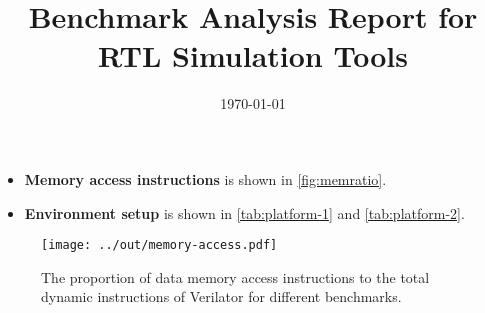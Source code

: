 \documentclass{article}
\title{Benchmark Analysis Report for RTL Simulation Tools}
\date{\today}
\author{}
\begin{document}
\maketitle

\begin{itemize}[noitemsep,topsep=0pt]
    \item {\bf Memory access instructions } is shown in \autoref{fig:memratio}.
    \item {\bf Environment setup} is shown in \autoref{tab:platform-1} and \autoref{tab:platform-2}.
  \end{itemize}




\centering


\begin{figure}[h!]
  \centering
  \texttt{[image: ../out/memory-access.pdf]}
  \vspace*{-4mm}
  \caption{The proportion of data memory access instructions to the total dynamic instructions of Verilator for different benchmarks.}
  \label{fig:memratio}
\end{figure}
\end{document}
